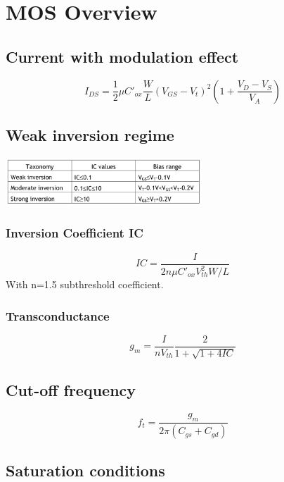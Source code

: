 \chapter{MOS Overview}

\section{Current with modulation effect}

\begin{equation}
I_{DS}=\frac{1}{2}\mu C'_{ox}\frac{W}{L}(V_{GS}-V_t)^2 (1+\frac{V_D-V_S}{V_A})
\end{equation}

\section{Weak inversion regime}

\centering
\includegraphics[width=0.55\textwidth]{Schermata.png}\\
\raggedright

\subsection{Inversion Coefficient IC}
\begin{equation}
IC=\frac{I}{2n\mu C'_{ox}V_{th}^2 W/L}
\end{equation}
With n=1.5 subthreshold coefficient.\\

\subsection{Transconductance}
\begin{equation}
g_m=\frac{I}{nV_{th}}\frac{2}{1+\sqrt{1+4IC}}
\end{equation}

\section{Cut-off frequency}
\begin{equation}
f_t=\frac{g_m}{2\pi(C_{gs}+C_{gd})}
\end{equation}

\section{Saturation conditions}

